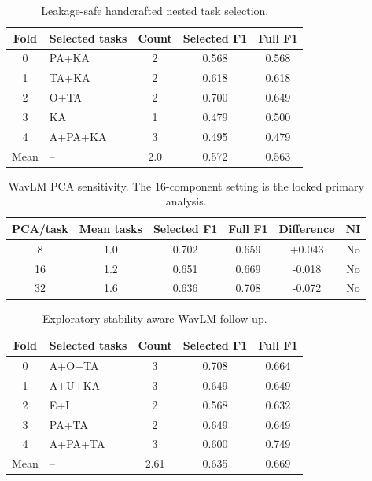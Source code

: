 
\begin{table}[t]
\centering
\caption{Leakage-safe handcrafted nested task selection.}
\label{tab:nested}
\small
\begin{tabular}{clccc}
\toprule
Fold & Selected tasks & Count & Selected F1 & Full F1 \\
\midrule
0 & PA+KA & 2 & 0.568 & 0.568 \\
1 & TA+KA & 2 & 0.618 & 0.618 \\
2 & O+TA & 2 & 0.700 & 0.649 \\
3 & KA & 1 & 0.479 & 0.500 \\
4 & A+PA+KA & 3 & 0.495 & 0.479 \\
\midrule
Mean & -- & 2.0 & 0.572 & 0.563 \\
\bottomrule
\end{tabular}
\end{table}

\begin{table}[t]
\centering
\caption{WavLM PCA sensitivity. The 16-component setting is the locked primary analysis.}
\label{tab:pca}
\small
\begin{tabular}{cccccc}
\toprule
PCA/task & Mean tasks & Selected F1 & Full F1 & Difference & NI \\
\midrule
8 & 1.0 & 0.702 & 0.659 & +0.043 & No \\
16 & 1.2 & 0.651 & 0.669 & -0.018 & No \\
32 & 1.6 & 0.636 & 0.708 & -0.072 & No \\
\bottomrule
\end{tabular}
\end{table}

\begin{table}[t]
\centering
\caption{Exploratory stability-aware WavLM follow-up.}
\label{tab:stabilityaware}
\small
\begin{tabular}{clccc}
\toprule
Fold & Selected tasks & Count & Selected F1 & Full F1 \\
\midrule
0 & A+O+TA & 3 & 0.708 & 0.664 \\
1 & A+U+KA & 3 & 0.649 & 0.649 \\
2 & E+I & 2 & 0.568 & 0.632 \\
3 & PA+TA & 2 & 0.649 & 0.649 \\
4 & A+PA+TA & 3 & 0.600 & 0.749 \\
\midrule
Mean & -- & 2.61 & 0.635 & 0.669 \\
\bottomrule
\end{tabular}
\end{table}

